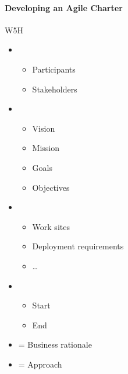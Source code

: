 \documentclass[letterpaper,10pt,english]{jupyterBook}
\begin{document}
\paragraph{Developing an Agile Charter}
\label{\detokenize{APM/agile:developing-an-agile-charter}}
\sphinxAtStartPar
W5H
\begin{itemize}
\item {} 
\sphinxAtStartPar
{}
\begin{itemize}
\item {} 
\sphinxAtStartPar
Participants

\item {} 
\sphinxAtStartPar
Stakeholders

\end{itemize}

\item {} 
\sphinxAtStartPar
{}
\begin{itemize}
\item {} 
\sphinxAtStartPar
Vision

\item {} 
\sphinxAtStartPar
Mission

\item {} 
\sphinxAtStartPar
Goals

\item {} 
\sphinxAtStartPar
Objectives

\end{itemize}

\item {} 
\sphinxAtStartPar
{}
\begin{itemize}
\item {} 
\sphinxAtStartPar
Work sites

\item {} 
\sphinxAtStartPar
Deployment requirements

\item {} 
\sphinxAtStartPar
…

\end{itemize}

\item {} 
\sphinxAtStartPar
{}
\begin{itemize}
\item {} 
\sphinxAtStartPar
Start

\item {} 
\sphinxAtStartPar
End

\end{itemize}

\item {} 
\sphinxAtStartPar
{} = Business rationale

\item {} 
\sphinxAtStartPar
{} = Approach

\end{itemize}
\end{document}
